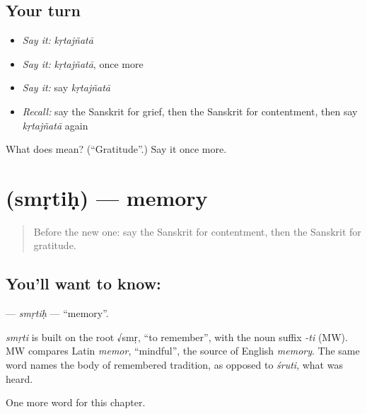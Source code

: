 \subsection*{Your turn}
\begin{itemize}
\raggedright
  \item \emph{Say it:} \emph{kṛtajñatā}
  \item \emph{Say it:} \emph{kṛtajñatā}, once more
  \item \emph{Say it:} say \emph{kṛtajñatā}
  \item \emph{Recall:} say the Sanskrit for grief, then the Sanskrit for contentment, then say \emph{kṛtajñatā} again
\end{itemize}

\begin{tcolorbox}[breakable,colback=teal!4,colframe=teal!35!black,title={Before you move on}]
What does  mean? (\textquotedblleft{}Gratitude\textquotedblright{}.) Say it once more.
\end{tcolorbox}
\section[\texorpdfstring{\sk{स्मृतिः} (smṛtiḥ)}{स्मृतिः (smṛtiḥ)}]{ (smṛtiḥ) — memory}

\label{lesson:SA-C182-smrtih}



\begin{quote}
Before the new one: say the Sanskrit for contentment, then the Sanskrit for gratitude.
\end{quote}

\subsection*{You'll want to know: }
\textbf{} — \emph{smṛtiḥ} — \textquotedblleft{}memory\textquotedblright{}.

\begin{cousinweb}
\emph{smṛti} is built on the root √smṛ, \textquotedblleft{}to remember\textquotedblright{}, with the noun suffix \emph{-ti} (MW). MW compares Latin \emph{memor}, \textquotedblleft{}mindful\textquotedblright{}, the source of English \emph{memory}. The same word names the body of remembered tradition, as opposed to \emph{śruti}, what was heard.
\end{cousinweb}

\begin{grammarlens}[title={What you've built}]
One more word for this chapter.
\end{grammarlens}

